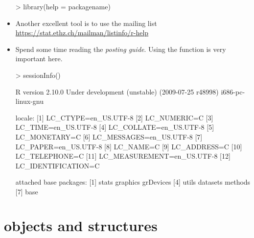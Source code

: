 \begin{frame}
\begin{itemize}
\begin{Schunk}
\begin{Sinput}
> library(help = packagename)
\end{Sinput}
\end{Schunk}
  \item Another excellent tool is to use the  mailing list \url{https://stat.ethz.ch/mailman/listinfo/r-help}
  \item Spend some time reading the \emph{posting guide}. Using the function  is very important here.
\begin{Schunk}
\begin{Sinput}
> sessionInfo()
\end{Sinput}
\begin{Soutput}
R version 2.10.0 Under development (unstable) (2009-07-25 r48998) 
i686-pc-linux-gnu 

locale:
 [1] LC_CTYPE=en_US.UTF-8      
 [2] LC_NUMERIC=C              
 [3] LC_TIME=en_US.UTF-8       
 [4] LC_COLLATE=en_US.UTF-8    
 [5] LC_MONETARY=C             
 [6] LC_MESSAGES=en_US.UTF-8   
 [7] LC_PAPER=en_US.UTF-8      
 [8] LC_NAME=C                 
 [9] LC_ADDRESS=C              
[10] LC_TELEPHONE=C            
[11] LC_MEASUREMENT=en_US.UTF-8
[12] LC_IDENTIFICATION=C       

attached base packages:
[1] stats     graphics  grDevices
[4] utils     datasets  methods  
[7] base     
\end{Soutput}
\end{Schunk}
  \end{itemize}
\end{frame}

\section{ objects and structures}

